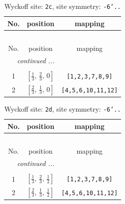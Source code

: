 \documentclass[fleqn,8pt]{jsarticle}
\begin{document}
\begin{longtable}{ccc}
\caption{Wyckoff site: {\tt 2c}, site symmetry: {\tt -6'..}}
 \\
 \hline \hline
No. & position & mapping \\ \hline \endfirsthead

\multicolumn{2}{l}{\tablename\ \thetable{}} \\
 \hline \hline
No. & position & mapping \\ \hline \endhead

 \hline \hline
\multicolumn{2}{r}{\footnotesize\it continued ...} \\ \endfoot

 \hline \hline
\multicolumn{2}{r}{} \\ \endlastfoot

1 & $\left[ \frac{1}{3},\, \frac{2}{3},\, 0 \right]$ & {\tt [1,2,3,7,8,9]} \\ \hline
2 & $\left[ \frac{2}{3},\, \frac{1}{3},\, 0 \right]$ & {\tt [4,5,6,10,11,12]} \\
\end{longtable}
\renewcommand{\arraystretch}{1.2}
\begin{longtable}{ccc}
\caption{Wyckoff site: {\tt 2d}, site symmetry: {\tt -6'..}}
 \\
 \hline \hline
No. & position & mapping \\ \hline \endfirsthead

\multicolumn{2}{l}{\tablename\ \thetable{}} \\
 \hline \hline
No. & position & mapping \\ \hline \endhead

 \hline \hline
\multicolumn{2}{r}{\footnotesize\it continued ...} \\ \endfoot

 \hline \hline
\multicolumn{2}{r}{} \\ \endlastfoot

1 & $\left[ \frac{1}{3},\, \frac{2}{3},\, \frac{1}{2} \right]$ & {\tt [1,2,3,7,8,9]} \\ \hline
2 & $\left[ \frac{2}{3},\, \frac{1}{3},\, \frac{1}{2} \right]$ & {\tt [4,5,6,10,11,12]} \\
\end{longtable}
\renewcommand{\arraystretch}{1.2}
\end{document}
